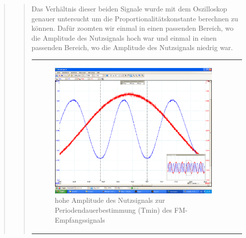 \begin{quote}
\begin{quote}
        Das Verhältnis dieser beiden Signale wurde mit dem Oszilloskop genauer
        untersucht um die Proportionalitätskonstante berechnen zu können. Dafür
        zoomten wir einmal in einen passenden Bereich, wo die Amplitude des
        Nutzsignals hoch war und einmal in einen passenden Bereich, wo die
        Amplitude des Nutzsignals niedrig war.
        
         
                \begin{center}
            \begin{tabular}{ll}

            \hspace{-14em}
                \begin{minipage}{0.6\textwidth}

                    \begin{figure}[H]
                        \label{fig:}
                        \includegraphics[scale=0.5, trim = 2cm 6.5cm 1.5cm
                        8.5cm, clip]{./Bilder/aufgabe_4_12_sinus_high-ampl}
                        \caption{hohe Amplitude des Nutzsignals zur
                        Periodendauerbestimmung (Tmin) des FM-Empfangssignals}
                    \end{figure}

                \end{minipage}
                \begin{minipage}{0.6\textwidth}


\end{minipage}
\end{tabular}
\end{center}
\end{quote}
\end{quote}
